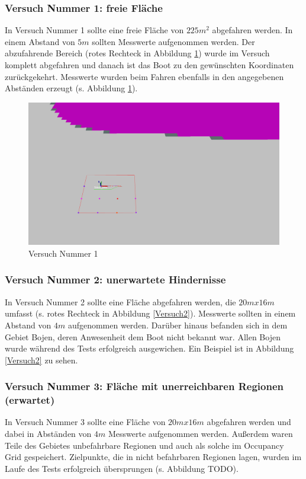 \documentclass[11pt]{article}
\begin{document}
\subsubsection{Versuch Nummer 1: freie Fläche}
In Versuch Nummer 1 sollte eine freie Fläche von $225m^2$ abgefahren werden. In einem Abstand von $5m$ sollten Messwerte aufgenommen werden. Der abzufahrende Bereich (rotes Rechteck in Abbildung \ref{Versuch1}) wurde im Versuch komplett abgefahren und danach ist das Boot zu den gewünschten Koordinaten zurückgekehrt. Messwerte wurden beim Fahren ebenfalls in den angegebenen Abständen erzeugt (s. Abbildung \ref{Versuch1}).

\begin{figure}[h]
	\centering
	\includegraphics[width=0.8\linewidth]{versuch1.png}
	\caption{Versuch Nummer 1}
	\label{Versuch1}
\end{figure}

\subsubsection{Versuch Nummer 2: unerwartete Hindernisse}
In Versuch Nummer 2 sollte eine Fläche abgefahren werden, die $20mx16m$ umfasst (s. rotes Rechteck in Abbildung \ref{Versuch2}). Messwerte sollten in einem Abstand von $4m$ aufgenommen werden. Darüber hinaus befanden sich in dem Gebiet Bojen, deren Anwesenheit dem Boot nicht bekannt war. Allen Bojen wurde während des Tests erfolgreich ausgewichen. Ein Beispiel ist in Abbildung \ref{Versuch2} zu sehen.

\subsubsection{Versuch Nummer 3: Fläche mit unerreichbaren Regionen (erwartet)}
In Versuch Nummer 3 sollte eine Fläche von $20mx16m$ abgefahren werden und dabei in Abständen von $4m$ Messwerte aufgenommen werden. Außerdem waren Teile des Gebietes unbefahrbare Regionen und auch als solche im Occupancy Grid gespeichert. Zielpunkte, die in nicht befahrbaren Regionen lagen, wurden im Laufe des Tests erfolgreich übersprungen (s. Abbildung TODO).
\end{document}
